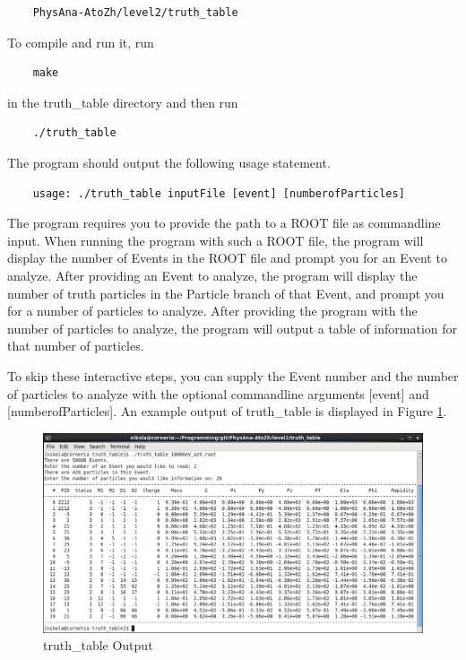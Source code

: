 \documentclass{article}
\begin{document}
\begin{verbatim}
	PhysAna-AtoZh/level2/truth_table
\end{verbatim}

To compile and run it, run

\begin{verbatim}
	make
\end{verbatim} 

in the truth\_table directory and then run

\begin{verbatim}
	./truth_table
\end{verbatim}

The program should output the following usage statement.

\begin{verbatim}
	usage: ./truth_table inputFile [event] [numberofParticles]
\end{verbatim}

The program requires you to provide the path to a ROOT file as commandline input.
When running the program with such a ROOT file, the program will display the number of
Events in the ROOT file and prompt you for an Event to analyze. After providing an
Event to analyze, the program will display the number of truth particles in the Particle
branch of that Event, and prompt you for a number of particles to analyze. After
providing the program with the number of particles to analyze, the program will output
a table of information for that number of particles.

\bigskip

To skip these interactive steps, you can supply the Event number and the number of
particles to analyze with the optional commandline arguments [event] and [numberofParticles].
An example output of truth\_table is displayed in Figure \ref{fig:truthTableOutput}.

\begin{figure}[!htbp]
	\centering
	\includegraphics[width = \linewidth]{truth_table_screenshot.png}
	\caption{truth\_table Output}
	\label{fig:truthTableOutput}
\end{figure}
\end{document}
